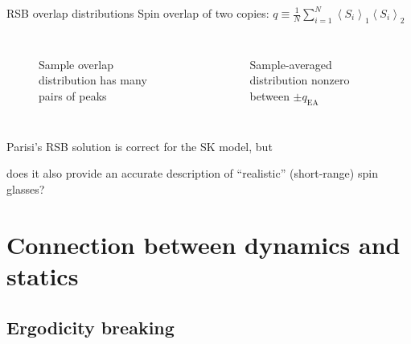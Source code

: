 \documentclass{beamer}
\newcommand{\av}[1]{\left<#1\right>}
\newcommand{\qea}{q_{\text{EA}}}
\begin{document}
\begin{frame}[fragile]{RSB overlap distributions}
  Spin overlap of two copies:
  $q \equiv \frac{1}{N} \sum_{i=1}^N \av{S_i}_1 \av{S_i}_2$
  \begin{columns}[T]
    \begin{figure}
      Sample overlap distribution has many pairs of peaks
    \end{figure}
    \begin{figure}
      
      Sample-averaged distribution nonzero between $\pm\qea$
    \end{figure}
  \end{columns}
  \vfill
  Parisi's RSB solution is correct for the SK model, but

  \alert{does it also provide an accurate description of ``realistic''
    (short-range) spin glasses?}
\end{frame}



\section{Connection between dynamics and statics}


\subsection{Ergodicity breaking}
\end{document}
